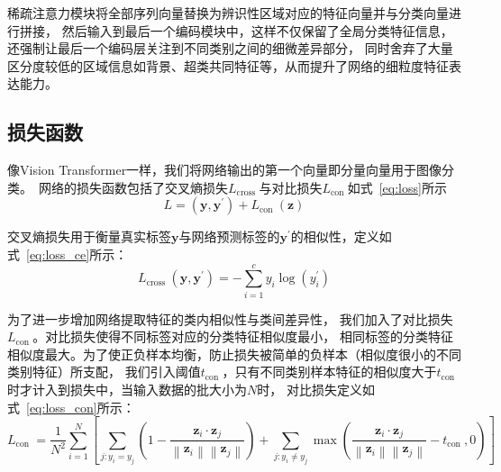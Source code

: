 稀疏注意力模块将全部序列向量替换为辨识性区域对应的特征向量并与分类向量进行拼接，
然后输入到最后一个编码模块中，这样不仅保留了全局分类特征信息，还强制让最后一个编码层关注到不同类别之间的细微差异部分，
同时舍弃了大量区分度较低的区域信息如背景、超类共同特征等，从而提升了网络的细粒度特征表达能力。

\subsection{损失函数}
像Vision Transformer一样，我们将网络输出的第一个向量即分量向量用于图像分类。\
网络的损失函数包括了交叉熵损失$L_{\text {cross }}$与对比损失$L_{\text {con }}$如式~\ref{eq:loss}所示
\begin{equation}
  L=\left(\boldsymbol{y}, \boldsymbol{y}^{\prime}\right)+L_{\text {con }}(\mathbf{z})
  \label{eq:loss}
\end{equation}

交叉熵损失用于衡量真实标签$\boldsymbol{y}$与网络预测标签的$\boldsymbol{y}^{\prime}$的相似性，定义如式~\ref{eq:loss_ce}所示：
\begin{equation}
  L_{\text {cross }}\left(\boldsymbol{y}, \boldsymbol{y}^{\prime}\right)=-\sum_{i=1}^{c} y_{i} \log \left(y_{i}^{\prime}\right)
  \label{eq:loss_ce}
\end{equation}

为了进一步增加网络提取特征的类内相似性与类间差异性，
我们加入了对比损失$L_{\text {con }}$。对比损失使得不同标签对应的分类特征相似度最小，
相同标签的分类特征相似度最大。为了使正负样本均衡，防止损失被简单的负样本（相似度很小的不同类别特征）所支配，
我们引入阈值$t_{\text {con }}$，只有不同类别样本特征的相似度大于$t_{\text {con }}$时才计入到损失中，当输入数据的批大小为$N$时，
对比损失定义如式~\ref{eq:loss_con}所示：
\begin{equation}
  L_{\text {con }}=\frac{1}{N^{2}} \sum_{i=1}^{N}\left[\sum_{j: y_{i}=y_{j}}\left(1-\frac{\mathbf{z}_{i} \cdot \mathbf{z}_{j}}{\left\|\mathbf{z}_{i}\right\|\left\|\mathbf{z}_{j}\right\|}\right)+\sum_{j: y_{i} \neq y_{j}} \max \left(\frac{\mathbf{z}_{i} \cdot \mathbf{z}_{j}}{\left\|\mathbf{z}_{i}\right\|\left\|\mathbf{z}_{j}\right\|}-t_{\text {con }}, 0\right)\right]
  \label{eq:loss_con}
\end{equation}





